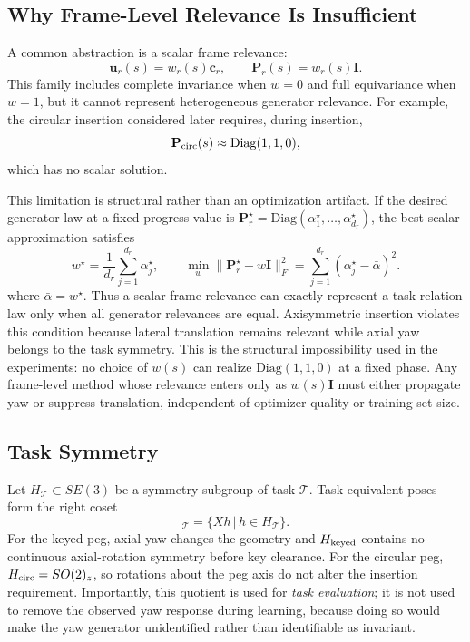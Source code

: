\documentclass[letterpaper,10pt,conference]{ieeeconf}
\begin{document}
\subsection{Why Frame-Level Relevance Is Insufficient}

A common abstraction is a scalar frame relevance:
\begin{equation}
    \bm u_r(s)=w_r(s)\bm c_r,\qquad
    \mathbf P_r(s)=w_r(s)\mathbf I.
    \label{eq:scalar}
\end{equation}
This family includes complete invariance when $w=0$ and full equivariance when
$w=1$, but it cannot represent heterogeneous generator relevance. For example,
the circular insertion considered later requires, during insertion,
\begin{equation}
    \mathbf P_{\rm circ}(s)
    \approx \mathrm{Diag}(1,1,0),
    \label{eq:circular_target}
\end{equation}
which has no scalar solution.

This limitation is structural rather than an optimization artifact. If the
desired generator law at a fixed progress value is
$\mathbf P_r^\star=\mathrm{Diag}(\alpha_1^\star,\ldots,\alpha_{d_r}^\star)$,
the best scalar approximation satisfies
\begin{equation}
    w^\star=\frac{1}{d_r}\sum_{j=1}^{d_r}\alpha_j^\star,\qquad
    \min_w\|\mathbf P_r^\star-w\mathbf I\|_F^2
    =
    \sum_{j=1}^{d_r}(\alpha_j^\star-\bar\alpha)^2 .
    \label{eq:best_scalar}
\end{equation}
where $\bar\alpha=w^\star$.
Thus a scalar frame relevance can exactly represent a task-relation law only
when all generator relevances are equal. Axisymmetric insertion violates this
condition because lateral translation remains relevant while axial yaw belongs
to the task symmetry.
This is the structural impossibility used in the experiments: no choice of
$w(s)$ can realize $\mathrm{Diag}(1,1,0)$ at a fixed phase. Any frame-level
method whose relevance enters only as $w(s)\mathbf I$ must either propagate yaw
or suppress translation, independent of optimizer quality or training-set size.

\subsection{Task Symmetry}

Let $H_{\mathcal T}\subset SE(3)$ be a symmetry subgroup of task $\mathcal T$.
Task-equivalent poses form the right coset
\begin{equation}
    [X]_{\mathcal T}=\{Xh\,|\,h\in H_{\mathcal T}\}.
\end{equation}
For the keyed peg, axial yaw changes the geometry and
$H_{\rm keyed}$ contains no continuous axial-rotation symmetry before key
clearance. For the circular
peg, $H_{\rm circ}=SO(2)_z$, so rotations about the peg axis do not alter the
insertion requirement.
Importantly, this quotient is used for \emph{task evaluation}; it is not used
to remove the observed yaw response during learning, because doing so would
make the yaw generator unidentified rather than identifiable as invariant.
\end{document}
